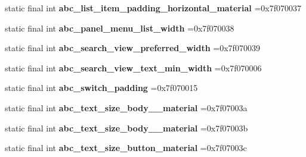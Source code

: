 \begin{DoxyCompactItemize}
\item 
\hypertarget{classcheck_1_1test_1_1_r_1_1dimen_a563444b1cede00563feba7e3996646fb}{}static final int {\bfseries abc\+\_\+list\+\_\+item\+\_\+padding\+\_\+horizontal\+\_\+material} =0x7f070037\label{classcheck_1_1test_1_1_r_1_1dimen_a563444b1cede00563feba7e3996646fb}

\item 
\hypertarget{classcheck_1_1test_1_1_r_1_1dimen_adf4308a8709c2235eb865b00ace7cd39}{}static final int {\bfseries abc\+\_\+panel\+\_\+menu\+\_\+list\+\_\+width} =0x7f070038\label{classcheck_1_1test_1_1_r_1_1dimen_adf4308a8709c2235eb865b00ace7cd39}

\item 
\hypertarget{classcheck_1_1test_1_1_r_1_1dimen_a39bf8304375a94c741d83cbded7facfc}{}static final int {\bfseries abc\+\_\+search\+\_\+view\+\_\+preferred\+\_\+width} =0x7f070039\label{classcheck_1_1test_1_1_r_1_1dimen_a39bf8304375a94c741d83cbded7facfc}

\item 
\hypertarget{classcheck_1_1test_1_1_r_1_1dimen_a8499981221cdf49d34290e3a4c0deb38}{}static final int {\bfseries abc\+\_\+search\+\_\+view\+\_\+text\+\_\+min\+\_\+width} =0x7f070006\label{classcheck_1_1test_1_1_r_1_1dimen_a8499981221cdf49d34290e3a4c0deb38}

\item 
\hypertarget{classcheck_1_1test_1_1_r_1_1dimen_a6bec7fbc6f1099fa0bdf09e8e7aa2360}{}static final int {\bfseries abc\+\_\+switch\+\_\+padding} =0x7f070015\label{classcheck_1_1test_1_1_r_1_1dimen_a6bec7fbc6f1099fa0bdf09e8e7aa2360}

\item 
\hypertarget{classcheck_1_1test_1_1_r_1_1dimen_a284058d098de357643a6ddc778d77774}{}static final int {\bfseries abc\+\_\+text\+\_\+size\+\_\+body\+\_\+\_\+material} =0x7f07003a\label{classcheck_1_1test_1_1_r_1_1dimen_a284058d098de357643a6ddc778d77774}

\item 
\hypertarget{classcheck_1_1test_1_1_r_1_1dimen_a993a8a8f2af47af190bac50209ef0ed6}{}static final int {\bfseries abc\+\_\+text\+\_\+size\+\_\+body\+\_\+\_\+material} =0x7f07003b\label{classcheck_1_1test_1_1_r_1_1dimen_a993a8a8f2af47af190bac50209ef0ed6}

\item 
\hypertarget{classcheck_1_1test_1_1_r_1_1dimen_a0968c80dc43c3e762ba337b66a3dcb46}{}static final int {\bfseries abc\+\_\+text\+\_\+size\+\_\+button\+\_\+material} =0x7f07003c\label{classcheck_1_1test_1_1_r_1_1dimen_a0968c80dc43c3e762ba337b66a3dcb46}


\end{DoxyCompactItemize}
